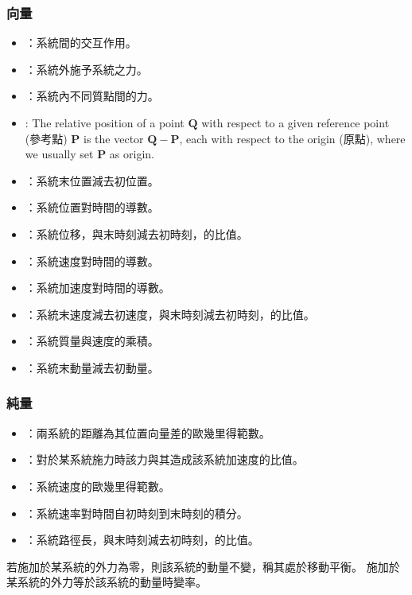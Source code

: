 \documentclass[a4paper,12pt]{article}
\begin{document}
\subsubsection{向量}
\begin{itemize}
\item{}：系統間的交互作用。
\item{}：系統外施予系統之力。
\item{}：系統內不同質點間的力。
\item{}: The relative position of a point $\mathbf{Q}$ with respect to a given reference point (參考點) $\mathbf{P}$ is the vector $\mathbf{Q}-\mathbf{P}$, each with respect to the origin (原點), where we usually set $\mathbf{P}$ as origin.
\item{}：系統末位置減去初位置。
\item{}：系統位置對時間的導數。
\item{}：系統位移，與末時刻減去初時刻，的比值。
\item{}：系統速度對時間的導數。
\item{}：系統加速度對時間的導數。
\item{}：系統末速度減去初速度，與末時刻減去初時刻，的比值。
\item{}：系統質量與速度的乘積。
\item{}：系統末動量減去初動量。
\end{itemize}
\subsubsection{純量}
\begin{itemize}
\item{}：兩系統的距離為其位置向量差的歐幾里得範數。
\item{}：對於某系統施力時該力與其造成該系統加速度的比值。
\item{}：系統速度的歐幾里得範數。
\item{}：系統速率對時間自初時刻到末時刻的積分。
\item{}：系統路徑長，與末時刻減去初時刻，的比值。
\end{itemize}
若施加於某系統的外力為零，則該系統的動量不變，稱其處於移動平衡。
施加於某系統的外力等於該系統的動量時變率。
\end{document}
